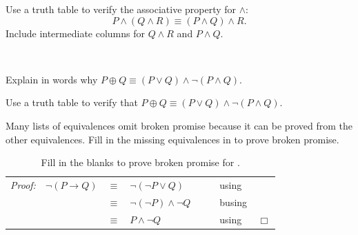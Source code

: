 \begin{exer}[\exerP] %
\label{exer_truthtable_assoc}  
    Use a truth table to verify the associative property for $\land$: $$P \land (Q \land R) \equiv (P \land Q) \land R.$$
    Include intermediate columns for $Q \land R$ and $P \land Q$.
\end{exer}

\begin{exer}[\exerU] %
\label{exer_xor_equiv}
~
    \begin{apart}
        \item Explain in words why $P \oplus Q \equiv (P \lor Q) \land \neg (P \land Q)$.
        \item Use a truth table to verify that $P \oplus Q \equiv (P \lor Q) \land \neg (P \land Q)$.
    \end{apart}
\end{exer}

\begin{exer}[\exerU] %
\label{exer_proof_equiv_broken_promise}
    Many lists of equivalences omit broken promise because it can be proved from the other equivalences.  Fill in the missing equivalences in  to prove broken promise.

    \begin{table}[hbtp]
        \centering
        \begin{tabular} {lrclll}
            \emph{Proof:} & $\neg(P \to Q)$ & $\equiv$ & $\neg(\neg P \lor Q)$ & ~\hspace{.25in}~& using \underline{\hspace{1in}}  \\ 
            & & $\equiv$ & $\neg(\neg P) \land \neg Q$ && busing \underline{\hspace{1in}}  \\ 
            & & $\equiv$ & $P \land \neg Q$ && using \underline{\hspace{1in}} ~ \hfill ~$\Box$ \\ 
        \end{tabular}
        \caption{Fill in the blanks to prove broken promise for .}
        \label{tab_proof_equiv_broken_promise}
    \end{table}
\end{exer}

